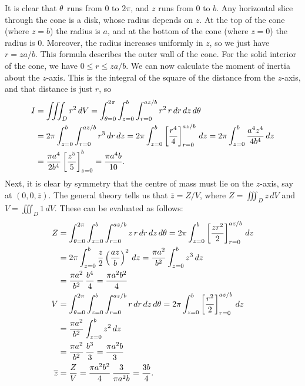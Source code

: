 \documentclass[a4paper]{amsart}
\renewenvironment{solution}{\SolutionInline}{\endSolutionInline}
\begin{document}
\begin{solution}
 It is clear that $\theta$ runs from $0$ to $2\pi$, and $z$ runs from
 $0$ to $b$.  Any horizontal slice through the cone is a disk, whose
 radius depends on $z$.  At the top of the cone (where $z=b$) the
 radius is $a$, and at the bottom of the cone (where $z=0$) the radius
 is $0$.  Moreover, the radius increases uniformly in $z$, so we just
 have $r=za/b$.  This formula describes the outer wall of the cone.
 For the solid interior of the cone, we have $0\leq r\leq za/b$.  We
 can now calculate the moment of inertia about the $z$-axis.  This is
 the integral of the square of the distance from the $z$-axis, and
 that distance is just $r$, so
 \begin{align*}
  I &= \iiint_D r^2\,dV
     = \int_{\tht=0}^{2\pi} \int_{z=0}^b \int_{r=0}^{az/b}
         r^2 \, r\, dr\,dz\,d\tht \\
    &= 2\pi \int_{z=0}^b \int_{r=0}^{az/b} r^3\,dr\,dz 
     = 2\pi \int_{z=0}^b \CH{\frac{r^4}{4}}_{r=0}^{az/b}\,dz 
     = 2\pi \int_{z=0}^b \frac{a^4z^4}{4b^4} \, dz \\
    &= \frac{\pi a^4}{2b^4} \CH{\frac{z^5}{5}}_{z=0}^b
     = \frac{\pi a^4b}{10}.
 \end{align*}
 Next, it is clear by symmetry that the centre of mass must lie on the
 $z$-axis, say at $(0,0,\overline{z})$.  The general theory tells us that
 $\overline{z}=Z/V$, where $Z=\iiint_D z\,dV$ and $V=\iiint_D 1\,dV$.  These
 can be evaluated as follows:
 \begin{align*}
  Z &= \int_{\tht=0}^{2\pi} \int_{z=0}^b \int_{r=0}^{az/b}
        z \, r\, dr\, dz\, d\tht 
     = 2\pi \int_{z=0}^b \CH{\frac{z r^2}{2}}_{r=0}^{az/b} \,dz \\
    &= 2\pi \int_{z=0}^b \frac{z}{2}\left(\frac{az}{b}\right)^2\, dz
     = \frac{\pi a^2}{b^2} \int_{z=0}^b z^3 \,dz \\
    &= \frac{\pi a^2}{b^2} \,\frac{b^4}{4} = \frac{\pi a^2b^2}{4} \\
  V &= \int_{\tht=0}^{2\pi} \int_{z=0}^b \int_{r=0}^{az/b}
        r\, dr\, dz\, d\tht 
     = 2\pi \int_{z=0}^b \CH{\frac{r^2}{2}}_{r=0}^{az/b} \,dz \\
    &= \frac{\pi a^2}{b^2} \int_{z=0}^b z^2 \,dz \\
    &= \frac{\pi a^2}{b^2} \,\frac{b^3}{3} = \frac{\pi a^2b}{3} \\
  \overline{z} &= \frac{Z}{V}
          = \frac{\pi a^2b^2}{4} \, \frac{3}{\pi a^2 b}
          = \frac{3b}{4}.
 \end{align*}
\end{solution}
\end{document}
